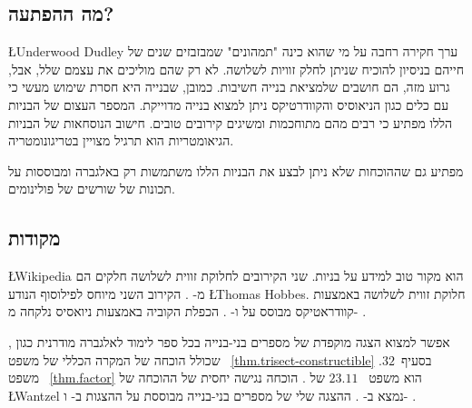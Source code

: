 \subsection*{מה ההפתעה?}

\L{Underwood Dudley}
ערך חקירה רחבה על מי שהוא כינה "תמהונים" שמבזבזים שנים של חייהם בניסיון להוכיח שניתן לחלק זוויות לשלושה. לא רק שהם מוליכים את עצמם שלל, אבל, גרוע מזה, הם חושבים שלמציאת בנייה חשיבות. כמובן, שבנייה היא חסרת שימוש מעשי כי עם כלים כגון הניאוסיס והקוודרטיקס ניתן למצוא בנייה מדוייקת. המספר העצום של הבניות הללו מפתיע כי רבים מהם מתוחכמות ומשיגים קירובים טובים. חישוב הנוסחאות של הבניות הגיאומטריות הוא תרגיל מצויין בטריגונומטריה.

מפתיע גם שההוכחות שלא ניתן לבצע את הבניות הללו משתמשות רק באלגברה ומבוססות על תכונות של שורשים של פולינומים.


\subsection*{מקודות}

\L{Wikipedia} \cite{wiki:tri, wiki:neu, wiki:quad}
הוא מקור טוב למידע על בניות. שני הקירובים לחלוקת זווית לשלושה חלקים הם מ-%
\cite[עמודים
67-68, 95-96]{dudley-budget}.
הקירוב השני מיוחס לפילוסוף הנודע
\L{Thomas Hobbes}.
חלוקת זווית לשלושה באמצעות קוודראטיקס מבוסס על
\cite[עמודים~48-49]{martin}
ו-%
\cite[עמודים 6-7]{dudley-budget}.
הכפלת הקוביה באמצעות ניואסיס נלקחה מ-%
 \cite{dorrie2}.

אפשר למצוא הצגה מוקפדת של מספרים בני-בנייה בכל ספר לימוד לאלגברה מודרנית כגון
\cite{fraleigh},
שכולל הוכחה של המקרה הכללי של משפט%
~\ref{thm.trisect-constructible}
בסעיף~$32$. משפט%
~\ref{thm.factor}
הוא משפט%
~$23.11$
של
\cite{fraleigh}.
הוכחה נגישה יחסית של ההוכחה של 
\L{Wantzel}
נמצא ב-%
\cite{suzuki}.
ההצגה שלי של מספרים בני-בנייה מבוססת על ההצגות ב-%
\cite[פרק~\L{III}]{courant}
ו-%
\cite{laugwitz}.

